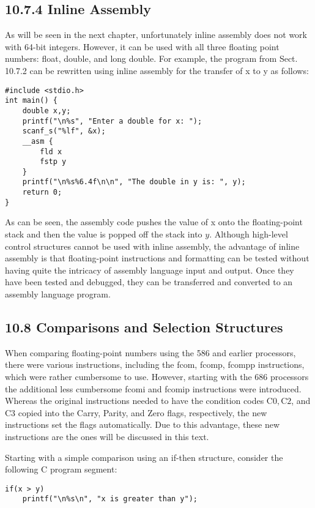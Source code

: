 \documentclass[10pt]{article}
\begin{document}
\subsection*{10.7.4 Inline Assembly}
As will be seen in the next chapter, unfortunately inline assembly does not work with 64-bit integers. However, it can be used with all three floating point numbers: float, double, and long double. For example, the program from Sect. 10.7.2 can be rewritten using inline assembly for the transfer of x to y as follows:

\begin{verbatim}
#include <stdio.h>
int main() {
    double x,y;
    printf("\n%s", "Enter a double for x: ");
    scanf_s("%lf", &x);
    __asm {
        fld x
        fstp y
    }
    printf("\n%s%6.4f\n\n", "The double in y is: ", y);
    return 0;
}
\end{verbatim}

As can be seen, the assembly code pushes the value of x onto the floating-point stack and then the value is popped off the stack into $y$. Although high-level control structures cannot be used with inline assembly, the advantage of inline assembly is that floating-point instructions and formatting can be tested without having quite the intricacy of assembly language input and output. Once they have been tested and debugged, they can be transferred and converted to an assembly language program.

\subsection*{10.8 Comparisons and Selection Structures}
When comparing floating-point numbers using the 586 and earlier processors, there were various instructions, including the fcom, fcomp, fcompp instructions, which were rather cumbersome to use. However, starting with the 686 processors the additional less cumbersome fcomi and fcomip instructions were introduced. Whereas the original instructions needed to have the condition codes $\mathrm{C} 0, \mathrm{C} 2$, and C3 copied into the Carry, Parity, and Zero flags, respectively, the new instructions set the flags automatically. Due to this advantage, these new instructions are the ones will be discussed in this text.

Starting with a simple comparison using an if-then structure, consider the following C program segment:

\begin{verbatim}
if(x > y)
    printf("\n%s\n", "x is greater than y");
\end{verbatim}
\end{document}
